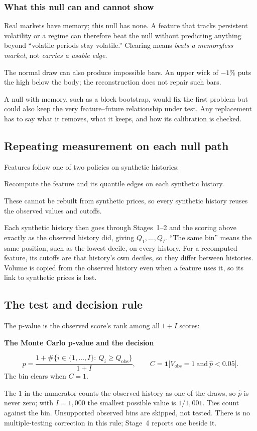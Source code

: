 \documentclass[11pt]{article}
\newcommand{\topic}[1]{\Needspace{6\baselineskip}\subsubsection*{#1}}
\newenvironment{keyconcept}[1]{%
  \par\addvspace{8pt}\begin{lrbox}{\conceptbox}%
  \begin{minipage}{\dimexpr\linewidth-24pt\relax}%
  \setlength{\parindent}{0pt}%
  {\normalsize\bfseries\color{ConceptInk}#1\par}\large
}{%
  \end{minipage}\end{lrbox}%
  \noindent{\setlength{\fboxsep}{12pt}%
  \colorbox{ConceptPaper}{\usebox{\conceptbox}}}\par\addvspace{8pt}}
\newcommand{\ind}{\mathbf{1}}
\begin{document}
\topic{What this null can and cannot show}

Real markets have memory; this null has none. A feature that tracks
persistent volatility or a regime can therefore beat the null without
predicting anything beyond ``volatile periods stay volatile.'' Clearing
means \emph{beats a memoryless market}, not \emph{carries a usable edge}.

The normal draw can also produce impossible bars. An upper wick of $-1\%$
puts the high below the body; the reconstruction does not repair such bars.

A null with memory, such as a block bootstrap, would fix the first problem
but could also keep the very feature--future relationship under test. Any
replacement has to say what it removes, what it keeps, and how its
calibration is checked.

\subsection{Repeating measurement on each null path}

Features follow one of two policies on synthetic histories:
\begin{description}[font=\normalfont\large\bfseries\color{ConceptInk}]
 \item[OHLCV-derived feature (recomputed)] Recompute the feature and its
       quantile edges on each synthetic history.
 \item[External, calendar, or workspace-extension feature (fixed)]
       These cannot be rebuilt from synthetic prices, so every synthetic
       history reuses the observed values and cutoffs.
\end{description}
Each synthetic history then goes through Stages~1--2 and the scoring above
exactly as the observed history did, giving $Q_1,\ldots,Q_I$. ``The same
bin'' means the same position, such as the lowest decile, on every history.
For a recomputed feature, its cutoffs are that history's own deciles, so
they differ between histories. Volume is copied from the observed history
even when a feature uses it, so its link to synthetic prices is lost.

\subsection{The test and decision rule}

The p-value is the observed score's rank among all $1+I$ scores:
\begin{keyconcept}{The Monte Carlo p-value and the decision}
\[
 \widehat p=\frac{1+\#\{i\in\{1,\ldots,I\}:\ Q_i\geq Q_{\mathrm{obs}}\}}{1+I},
 \qquad
 C=\ind\bigl[V_{\mathrm{obs}}=1\ \text{and}\ \widehat p<0.05\bigr].
\]
\normalsize The bin clears when $C=1$.
\end{keyconcept}
The $1$ in the numerator counts the observed history as one of the draws,
so $\widehat p$ is never zero; with $I=1{,}000$ the smallest possible value
is $1/1{,}001$. Ties count against the bin. Unsupported observed bins are
skipped, not tested. There is no multiple-testing correction in this rule;
Stage~4 reports one beside it.
\end{document}
